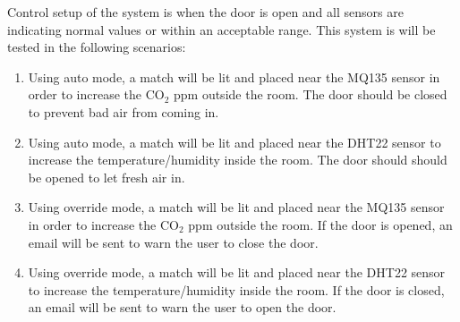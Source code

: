 Control setup of the system is when the door is open and all sensors are
indicating normal values or within an acceptable range. This system is will be
tested in the following scenarios:
\begin{enumerate}
      \item Using auto mode, a match will be lit and placed near the MQ135 sensor
            in order to increase the CO$_2$ ppm outside the room. The door should
            be closed to prevent bad air from coming in.
      \item Using auto mode, a match will be lit and placed near the DHT22 sensor
            to increase the temperature/humidity inside the room. The door should
            should be opened to let fresh air in.
      \item Using override mode, a match will be lit and placed near the MQ135
            sensor in order to increase the CO$_2$ ppm outside the room. If the door
            is opened, an email will be sent to warn the user to close the door.
      \item Using override mode, a match will be lit and placed near the DHT22
            sensor to increase the temperature/humidity inside the room. If the door
            is closed, an email will be sent to warn the user to open the door.
\end{enumerate}
